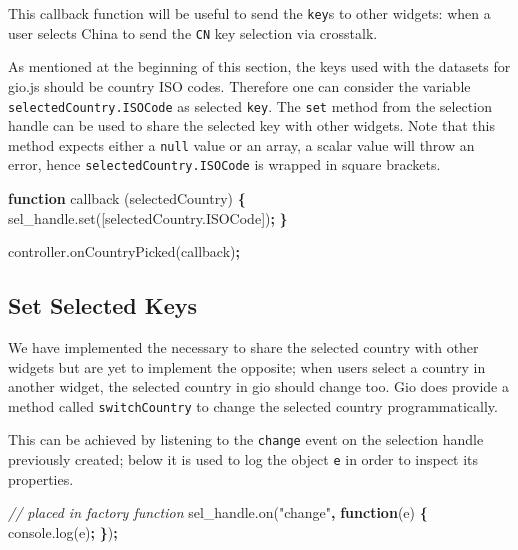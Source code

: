 \documentclass[
]{krantz}
\makeatletter
\newenvironment{Shaded}{\begin{snugshade}}{\end{snugshade}}
\newcommand{\AttributeTok}[1]{\textcolor[rgb]{0.61,0.61,0.61}{#1}}
\newcommand{\CommentTok}[1]{\textcolor[rgb]{0.37,0.37,0.37}{\textit{#1}}}
\newcommand{\KeywordTok}[1]{\textcolor[rgb]{0.27,0.27,0.27}{\textbf{#1}}}
\newcommand{\NormalTok}[1]{#1}
\newcommand{\OperatorTok}[1]{\textcolor[rgb]{0.43,0.43,0.43}{\textbf{#1}}}
\newcommand{\StringTok}[1]{\textcolor[rgb]{0.5,0.5,0.5}{#1}}
\newcommand{\VariableTok}[1]{\textcolor[rgb]{0,0,0}{#1}}
\newenvironment{kframe}{%
\medskip{}
\setlength{\fboxsep}{.8em}
 \def\at@end@of@kframe{}%
 \ifinner\ifhmode%
  \def\at@end@of@kframe{\end{minipage}}%
  \begin{minipage}{\columnwidth}%
 \fi\fi%
 \def\FrameCommand##1{\hskip\@totalleftmargin \hskip-\fboxsep
 \colorbox{shadecolor}{##1}\hskip-\fboxsep
     \hskip-\linewidth \hskip-\@totalleftmargin \hskip\columnwidth}%
 \MakeFramed {\advance\hsize-\width
   \@totalleftmargin\z@ \linewidth\hsize
   \@setminipage}}%
 {\par\unskip\endMakeFramed%
 \at@end@of@kframe}
\renewenvironment{Shaded}{\begin{kframe}}{\end{kframe}}
\makeatother
\begin{document}
This callback function will be useful to send the \texttt{key}s to other widgets: when a user selects China to send the \texttt{CN} key selection via crosstalk.

As mentioned at the beginning of this section, the keys used with the datasets for gio.js should be country ISO codes. Therefore one can consider the variable \texttt{selectedCountry.ISOCode} as selected \texttt{key}. The \texttt{set} method from the selection handle can be used to share the selected key with other widgets. Note that this method expects either a \texttt{null} value or an array, a scalar value will throw an error, hence \texttt{selectedCountry.ISOCode} is wrapped in square brackets.

\begin{Shaded}
\begin{Highlighting}[]
\KeywordTok{function} \AttributeTok{callback}\NormalTok{ (selectedCountry) }\OperatorTok{\{}
  \VariableTok{sel\_handle}\NormalTok{.}\AttributeTok{set}\NormalTok{([}\VariableTok{selectedCountry}\NormalTok{.}\AttributeTok{ISOCode}\NormalTok{])}\OperatorTok{;}
\OperatorTok{\}}

\VariableTok{controller}\NormalTok{.}\AttributeTok{onCountryPicked}\NormalTok{(callback)}\OperatorTok{;}
\end{Highlighting}
\end{Shaded}

\hypertarget{linking-widgets-set-keys}{%
\subsection{Set Selected Keys}\label{linking-widgets-set-keys}}

We have implemented the necessary to share the selected country with other widgets but are yet to implement the opposite; when users select a country in another widget, the selected country in gio should change too. Gio does provide a method called \texttt{switchCountry} to change the selected country programmatically.

This can be achieved by listening to the \texttt{change} event on the selection handle previously created; below it is used to log the object \texttt{e} in order to inspect its properties.

\begin{Shaded}
\begin{Highlighting}[]
\CommentTok{// placed in factory function}
\VariableTok{sel\_handle}\NormalTok{.}\AttributeTok{on}\NormalTok{(}\StringTok{"change"}\OperatorTok{,} \KeywordTok{function}\NormalTok{(e) }\OperatorTok{\{}
  \VariableTok{console}\NormalTok{.}\AttributeTok{log}\NormalTok{(e)}\OperatorTok{;}
\OperatorTok{\}}\NormalTok{)}\OperatorTok{;}
\end{Highlighting}
\end{Shaded}
\end{document}
